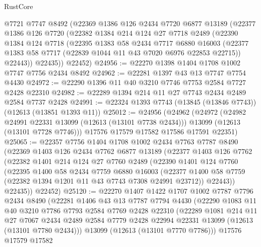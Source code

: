 \begin{lexlean}{RustCore}
\begin{coremodule}
    @7721
    @7747
    @8492
    (@22369
      @1386
      @126
      @2434
      @7720
      @6877
      @13189
      (@22377
        @1386
        @126
        @7720
        (@22382
          @1384
          @214
          @124
          @27
          @7718
          @2489
          (@22390
            @1384
            @124
            @7718
            (@22395
              @1383
              @58
              @2434
              @7717
              @6880
              @16003
              (@22377 @1383 @58 @7717 (@22839 @1044 @11 @43 @7020 @6976 @22853 @22715))
              @22443))
          @22435))
      @22452)
@24956 := @22270 @1398 @1404 @1708 @1002 @7747 @7756 @2434 @8492
@24962 := @22281 @1397 @43 @13 @7747 @7754 @4430
@24972 := @22290 @1396 @11 @40 @3210 @7746 @7753 @2584 @7727 @2428 @22310
@24982 := @22289 @1394 @214 @11 @27 @7743 @2434 @2489 @2584 @7737 @2428
@24991 := @22324 @1393 @7743 (@13845 (@13846 @7743)) (@12613 (@13851 @1393 @11))
@25012 := @24956
    (@24962
      (@24972
        (@24982 @24991 @22331 @13099 (@12613 (@13101 @7738 @2434)))
        @13099
        (@12613 (@13101 @7728 @7746)))
      @17576
      @17579
      @17582
      @17586
      @17591
      @22351)
@25065 := @22357
    @7756
    @1404
    @1708
    @1002
    @2434
    @7763
    @7787
    @8490
    (@22369
      @1403
      @126
      @2434
      @7762
      @6877
      @13189
      (@22377
        @1403
        @126
        @7762
        (@22382
          @1401
          @214
          @124
          @27
          @7760
          @2489
          (@22390
            @1401
            @124
            @7760
            (@22395
              @1400
              @58
              @2434
              @7759
              @6880
              @16003
              (@22377 @1400 @58 @7759 (@22382 @1394 @1201 @11 @43 @7743 @7308 @24991 @23712))
              @22443))
          @22435))
      @22452)
@25120 := @22270
    @1407
    @1422
    @1707
    @1002
    @7787
    @7796
    @2434
    @8490
    (@22281
      @1406
      @43
      @13
      @7787
      @7794
      @4430
      (@22290
        @1083
        @11
        @40
        @3210
        @7786
        @7793
        @2584
        @7769
        @2428
        @22310
        (@22289
          @1081
          @214
          @11
          @27
          @7067
          @2434
          @2489
          @2584
          @7779
          @2428
          @22994
          @22331
          @13099
          (@12613 (@13101 @7780 @2434)))
        @13099
        (@12613 (@13101 @7770 @7786)))
      @17576
      @17579
      @17582

\end{coremodule}
\end{lexlean}
